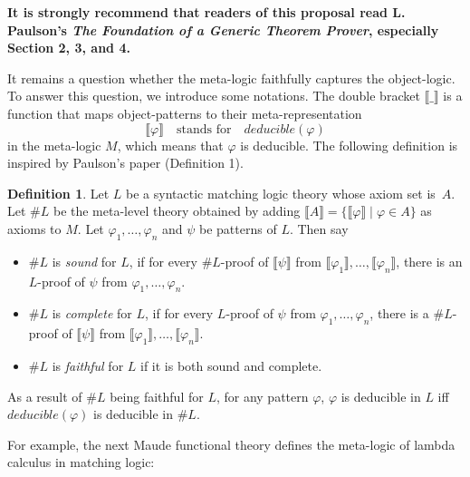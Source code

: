 \documentclass[UTF8]{article}
\newcommand{\comment}[1]
    {\par {\bfseries \color{blue} #1 \par}} %
\newcounter{thmcounter}
\theoremstyle{plain}
\theoremstyle{definition}
\newtheorem{definition}[thmcounter]{Definition}
\theoremstyle{remark}
\newcommand{\Bracket}[1]
    {\llbracket#1\rrbracket}
\begin{document}
\comment{It is strongly recommend that readers of this proposal read L. 
Paulson's \emph{The Foundation of a Generic Theorem Prover}, especially Section 
2, 3, and 4.}

It remains a question whether the meta-logic faithfully captures the 
object-logic. 
To answer this question, we introduce some notations.
The double bracket $\Bracket{\_}$ is a function that maps object-patterns to 
their meta-representation
$$\Bracket{\varphi} \quad \text{stands for} \quad \textit{deducible}(\varphi)$$
in the meta-logic $M$, which means that $\varphi$ is deducible. 
The following definition is inspired by Paulson's paper (Definition 1). 
\begin{definition}
	Let $L$ be a syntactic matching logic theory whose axiom set is~$A$. 
	Let $\# L$ be the meta-level theory obtained by adding $\Bracket{A} = 
	\{\Bracket{\varphi} 
	\mid 
	\varphi \in A\}$ as axioms to $M$. 
	Let	$\varphi_1,\dots,\varphi_n$ and $\psi$ be patterns of $L$.	
	Then say
	\begin{itemize}
		\item $\#L$ is \emph{sound} for $L$, if for every $\#L$-proof of 
		$\Bracket{\psi}$ from $\Bracket{\varphi_1}, \dots, 
		\Bracket{\varphi_n}$, there is an $L$-proof of $\psi$ from 
		$\varphi_1,\dots,\varphi_n$.
		\item $\#L$ is \emph{complete} for $L$, if for every $L$-proof of 
		$\psi$ from $\varphi_1,\dots,\varphi_n$, there is a $\#L$-proof of 
		$\Bracket{\psi}$ from $\Bracket{\varphi_1}, \dots, \Bracket{\varphi_n}$.
		\item $\#L$ is \emph{faithful} for $L$ if it is both sound and complete.
	\end{itemize}
    As a result of $\#L$ being faithful for $L$, for any pattern $\varphi$, 
    $\varphi$ is deducible in $L$ iff $\mathit{deducible}(\varphi)$ is 
    deducible in $\#L$.
\end{definition}


For example, the next Maude functional theory defines the meta-logic of lambda 
calculus in matching logic:
\end{document}
